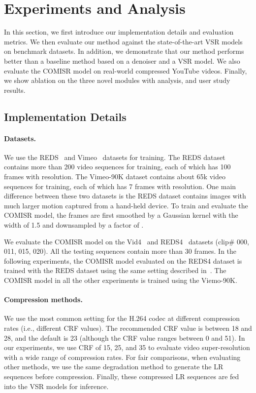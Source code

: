 
\section{Experiments and Analysis}
\label{sec:exp}
In this section, we first introduce our implementation details and evaluation metrics.
We then evaluate our method against the state-of-the-art VSR models on benchmark datasets.
In addition, we demonstrate that our method performs better 
than a baseline method based on a denoiser and a VSR model.
We also evaluate the COMISR model on real-world compressed YouTube videos.
Finally, we show ablation on the three novel modules with analysis, and user study results.
\subsection{Implementation Details}
\label{impldetails}

\paragraph{Datasets.} 
We use the REDS~\cite{Nah_2019_CVPR_Workshops_REDS} and Vimeo~\cite{xue2019video} datasets for training. 
The REDS dataset contains more than 200 video sequences for training, each of which has 100 frames with  resolution.
The Vimeo-90K dataset contains about 65k video sequences for training, each of which has 7 frames with  resolution.
One main difference between these two datasets is the REDS dataset contains images with much larger motion 
captured from a hand-held device.
To train and evaluate the COMISR model, the frames are first smoothed by a Gaussian kernel with the width of 1.5 and downsampled by a factor of .

We evaluate the COMISR model on the Vid4~\cite{vid4} and REDS4~\cite{Nah_2019_CVPR_Workshops_REDS} datasets (clip\# 000, 011, 015, 020). 
All the testing sequences contain more than 30 frames.  In the following experiments, the COMISR model evaluated on the REDS4 dataset is trained with the REDS dataset using the same setting described in~\cite{edvr}. 
The COMISR model in all the other experiments is trained using the Viemo-90K.

\vspace{-4mm}
\paragraph{Compression methods.} We use the most common setting for the H.264 codec at different compression rates (i.e., different CRF values).  
The recommended CRF value is between 18 and 28, and the default is 23 (although the CRF value ranges between 0 and 51).
In our experiments, we use CRF of 15, 25, and 35 to evaluate video super-resolution with a wide range of compression rates. 
For fair comparisons, when evaluating other methods, we use the same degradation method to generate the LR sequences before compression.  
Finally, these compressed LR sequences are fed into the VSR models for inference.

